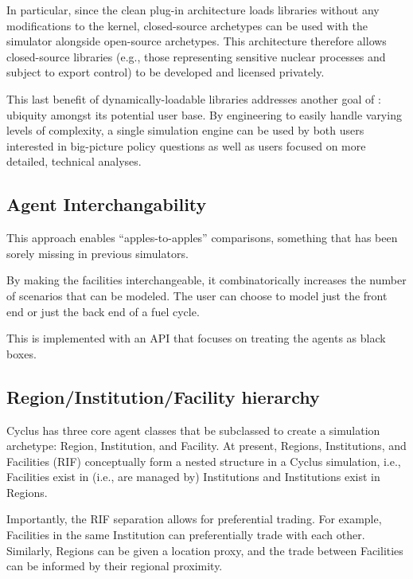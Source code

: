 In particular, since the clean plug-in architecture loads libraries without any
modifications to the \Cyclus kernel, closed-source archetypes can be used with
the simulator alongside open-source archetypes. This architecture therefore
allows closed-source libraries (e.g., those representing sensitive nuclear
processes and subject to export control) to be developed and licensed privately.

This last benefit of dynamically-loadable libraries addresses
another goal of \Cyclus: ubiquity amongst its potential user base. By
engineering \Cyclus to easily handle varying levels of complexity, a single
simulation engine can be used by both users interested in big-picture policy
questions as well as users focused on more detailed, technical
analyses.


\subsection{Agent Interchangability}

This approach enables ``apples-to-apples'' comparisons, something that has been 
sorely missing in previous simulators.

By making the facilities interchangeable, it combinatorically increases the 
number of scenarios that can be modeled. The user can choose to model just the 
front end or just the back end of a fuel cycle. 

This is implemented with an API that focuses on treating the agents as black 
boxes. 

\subsection{Region/Institution/Facility hierarchy}

Cyclus has three core agent classes that be subclassed to create a simulation
archetype: Region, Institution, and Facility. At present, Regions, Institutions,
and Facilities (RIF) conceptually form a nested structure in a Cyclus simulation,
i.e., Facilities exist in (i.e., are managed by) Institutions and Institutions
exist in Regions.

Importantly, the RIF separation allows for preferential trading. For example,
Facilities in the same Institution can preferentially trade with each
other. Similarly, Regions can be given a location proxy, and the trade between
Facilities can be informed by their regional proximity.

